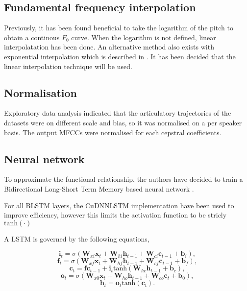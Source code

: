 \documentclass[a4paper]{article}
\begin{document}
\subsection{Fundamental frequency interpolation}

Previously, it has been found beneficial to take the logarithm of the
pitch to obtain a continous \( F_0 \) curve.
When the logarithm is not defined, linear  interpolatation has been done. \cite{Gonzalez2017}
An alternative method also exists with exponential interpolation
which is described in \cite{Chen1997}. It has been decided that the
linear interpolation technique will be used. 

\subsection{Normalisation}

Exploratory data analysis indicated that the articulatory trajectories of
the datasets were on different scale and bias, so it was normalised
on a per speaker basis. The output MFCCs were normalised for each cepstral
coefficients.

\subsection{Neural network}

To approximate the functional relationship, the authors have decided to
train a Bidirectional Long-Short Term Memory based neural network \cite{Hochreiter1997}. 

For all BLSTM layers, the CuDNNLSTM implementation have been used to
improve efficiency, however this limits the activation function to be
stricly \( \text{tanh}(\cdot) \)

A LSTM is governed by the following equations,

\begin{equation}
  \mathbf{i}_{t} = \sigma ( \mathbf{W}_{xi} \mathbf{x}_{t} + \mathbf{W}_{hi}
  \mathbf{h}_{t-1} + \mathbf{W}_{ci} \mathbf{c}_{t-1} + \mathbf{b}_{i}),  
\end{equation}
\begin{equation}
  \mathbf{f}_{t} = \sigma ( \mathbf{W}_{xf} \mathbf{x}_{t} + \mathbf{W}_{hf}
  \mathbf{h}_{t-1} + \mathbf{W}_{cf} \mathbf{c}_{t-1} + \mathbf{b}_{f}), 
\end{equation}
\begin{equation}
  \mathbf{c}_{t} = \mathbf{f} \mathbf{c}_{t-1} + \mathbf{i}_{t} \text{tanh} ( \mathbf{W}_{hc}
  \mathbf{h}_{t-1} + \mathbf{b}_c),
\end{equation}
\begin{equation}
  \mathbf{o}_{t} = \sigma ( \mathbf{W}_{x0}\mathbf{x}_t + \mathbf{W}_{ho} \mathbf{h}_{t-1}
  + \mathbf{W}_{co}\mathbf{c}_{t} + \mathbf{b}_0 ),
\end{equation}
\begin{equation}
  \mathbf{h}_t = \mathbf{o}_{t} \text{tanh} ( \mathbf{c}_t ).
  \end{equation}
\end{document}
